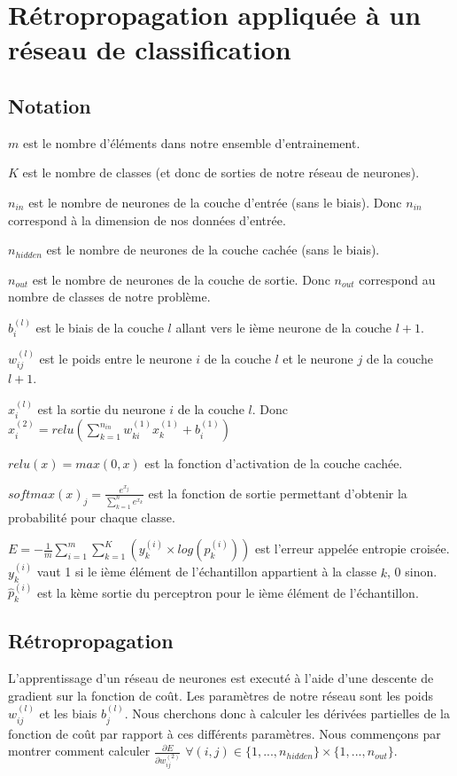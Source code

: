 \documentclass[a4paper,11pt,oneside,roman]{article}
\begin{document}
    \section{Rétropropagation appliquée à un réseau de classification}
    \subsection{Notation}
    $m$ est le nombre d'éléments dans notre ensemble d'entrainement.

    $K$ est le nombre de classes (et donc de sorties de notre réseau de neurones).

    $n_{in}$ est le nombre de neurones de la couche d'entrée (sans le biais). Donc $n_{in}$ correspond à la dimension de nos données d'entrée.
    
    $n_{hidden}$ est le nombre de neurones de la couche cachée (sans le biais).
    
    $n_{out}$ est le nombre de neurones de la couche de sortie. Donc $n_{out}$ correspond au nombre de classes de notre problème.
    
    $b_i^{(l)}$ est le biais de la couche $l$ allant vers le ième neurone de la couche $l+1$.

    $w_{ij}^{(l)}$ est le poids entre le neurone $i$ de la couche $l$ et le neurone $j$ de la couche $l+1$.
    
    $x_{i}^{(l)}$ est la sortie du neurone $i$ de la couche $l$. Donc $x_{i}^{(2)} = relu(\sum\limits_{k=1}^{n_{in}} w_{ki}^{(1)}x_{k}^{(1)} + b_i^{(1)})$
    
    $relu(x) = max(0,x)$ est la fonction d'activation de la couche cachée.

    $softmax(x)_j = \frac{e^{x_j}}{\sum\limits_{k=1}^n e^{x_k}}$ est la fonction de sortie permettant d'obtenir la probabilité pour chaque classe.

    $E = -\frac{1}{m} \sum\limits_{i=1}^m\sum\limits_{k=1}^K (y_{k}^{(i)} \times log(\hat{p}_{k}^{(i)}))$ est l'erreur appelée entropie croisée.
    $y_{k}^{(i)}$ vaut 1 si le ième élément de l'échantillon appartient à la classe $k$, 0 sinon. $\hat{p}_{k}^{(i)}$ est la kème sortie du perceptron pour le ième élément de l'échantillon.

    \subsection{Rétropropagation}

    L'apprentissage d'un réseau de neurones est executé à l'aide d'une descente de gradient sur la fonction de coût. Les paramètres de notre réseau sont les poids $w_{ij}^{(l)}$ et les biais $b_j^{(l)}$.
    Nous cherchons donc à calculer les dérivées partielles de la fonction de coût par rapport à ces différents paramètres. Nous commençons par montrer comment calculer $\frac{\partial E}{\partial w_{ij}^{(2)}}$ $\forall (i,j) \in \{1, ..., n_{hidden}\} \times \{1, ..., n_{out}\}.$
\end{document}
